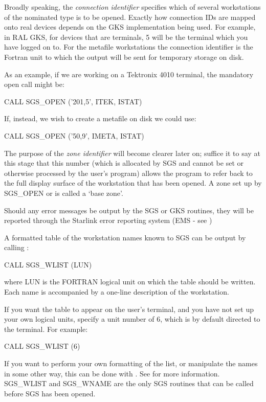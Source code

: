 \documentclass[11pt]{starlink}
\begin{document}
Broadly speaking, the {\label{conid}\em{connection identifier}}\/
specifies which of several
workstations of the nominated type is to be opened.
Exactly how connection IDs are mapped onto real devices depends on the GKS
implementation being used.
For example, in RAL GKS, for devices that are terminals, 5 will be the
terminal which you have logged on to.
For the metafile workstations the connection identifier is the Fortran unit to
which the output will be sent for temporary storage on disk.

As an example, if we are working on a Tektronix 4010 terminal, the mandatory
open call might be:
\begin{terminalv}
CALL SGS_OPEN ('201,5', ITEK, ISTAT)
\end{terminalv}
If, instead, we wish to create a metafile on disk we could use:
\begin{terminalv}
CALL SGS_OPEN ('50,9', IMETA, ISTAT)
\end{terminalv}

The purpose of the \emph{zone identifier}\/ will become clearer later on; suffice
it to say at this stage that this number (which is allocated by SGS and cannot
be set or otherwise processed by the user's program) allows the program to refer
back to the full display surface of the workstation that has been opened.
A zone set up by SGS\_OPEN or
 is called a `base zone'.

Should any error messages be output by the SGS or GKS routines, they will be
reported through the Starlink error reporting system (EMS - see
)

A formatted table of the workstation names known to SGS can be output by
calling :
\begin{terminalv}
CALL SGS_WLIST (LUN)
\end{terminalv}
where LUN is the FORTRAN logical unit on which the table should be written.
Each name is accompanied by a one-line description of the workstation.

If you want the table to appear on the user's terminal, and you have not set up
your own logical units, specify a unit number of 6, which is by default directed
to the terminal.
For example:
\begin{terminalv}
CALL SGS_WLIST (6)
\end{terminalv}
If you want to perform your own formatting of the list, or manipulate the names
in some other way, this can be done with .
See 
for more information.
SGS\_WLIST and SGS\_WNAME are the only SGS routines that can be called before
SGS has been opened.
\end{document}
